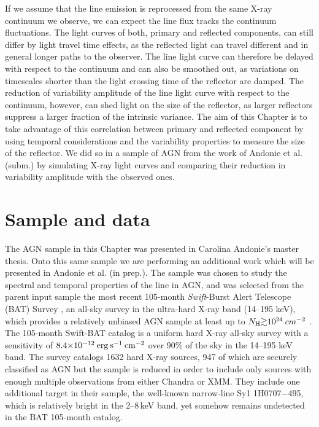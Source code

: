 If we assume that the \kalfa{} line emission is reprocessed from the same X-ray continuum we observe, we can expect the \kalfa{} line flux tracks the continuum fluctuations. The light curves of both, primary and reflected components, can still differ by light travel time effects, as the reflected light can travel different and in general longer paths to the observer. The \kalfa{} line light curve can therefore be delayed with respect to the continuum and can also be smoothed out, as variations on timescales shorter than the light crossing time of the reflector are damped. The reduction of variability amplitude of the \kalfa{} line light curve with respect to the continuum, however, can shed light on the size of the reflector, as larger reflectors suppress a larger fraction of the intrinsic variance. The aim of this Chapter is to take advantage of this correlation between primary and reflected component by using temporal considerations and the variability properties to measure the size of the reflector. We did so in a sample of AGN from the work of Andonie et al. (subm.) by simulating X-ray light curves and comparing their reduction in variability amplitude with the observed ones.

\section{Sample and data}
The AGN sample in this Chapter was presented in Carolina Andonie's master thesis. Onto this same sample we are performing an additional work which will be presented in Andonie et al. (in prep.). The sample was chosen to study the spectral and temporal properties of the \kalfa{} line in AGN, and was selected from the parent input sample the most recent 105-month \textit{Swift}-Burst Alert Telescope (BAT) Survey \citep{2018ApJS..235....4O}, an all-sky survey in the ultra-hard X-ray band (14--195 keV), which provides a relatively unbiased AGN sample at least up to $N_{\rm H}{\gtrsim}10^{24}\:cm^{-2}$ \citep{2015ApJ...815L..13R}. The 105-month Swift-BAT catalog is a uniform hard X-ray all-sky survey with a sensitivity of $8.4 {\times} 10^{-12}\: {\rm erg\:s^{-1}\:cm^{-2}}$ over $90\%$ of the sky in the 14–195 keV band. The survey catalogs 1632 hard X-ray sources, 947 of which are securely classified as AGN but the sample is reduced in order to include only sources with enough multiple observations from either Chandra or XMM. They include one additional target in their sample, the well-known narrow-line Sy1 1H0707$-$495, which is relatively bright in the 2--8\,keV band, yet somehow remains undetected in the BAT 105-month catalog.


